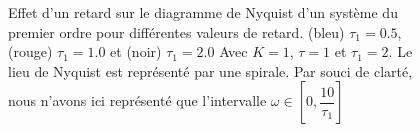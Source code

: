 \begin{figure}[!h]
\begin{center}
\end{center}
    \caption{Effet d'un retard sur le diagramme de Nyquist d'un système du premier ordre 
         pour différentes valeurs de retard. (bleu) $\tau_1=0.5$, (rouge) $\tau_1=1.0$ 
         et (noir) $\tau_1=2.0$
         Avec $K=1$, $\tau=1$ et $\tau_1=2$. Le lieu de Nyquist est représenté par 
         une spirale. Par souci de clarté, nous n'avons ici représenté que l'intervalle $\omega\in[0,\dfrac{10}{\tau_1}]$ 
         \label{fig-nyquist}}
\end{figure}

